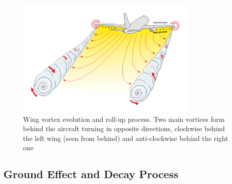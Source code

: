 \begin{figure}[ht]
    \centering
    \includegraphics[width=0.8\textwidth]{graphics/WakeVortexPlane.png}
    \caption[Wake vortex roll-up process]{Wing vortex evolution and roll-up process. Two main vortices form behind the aircraft turning in opposite directions, clockwise behind the left wing (seen from behind) and anti-clockwise behind the right one~\cite[p.~043]{magazine_aibus_safety}} \label{fig:vortex_develop}
\end{figure}

\subsection{Ground Effect and Decay Process}

